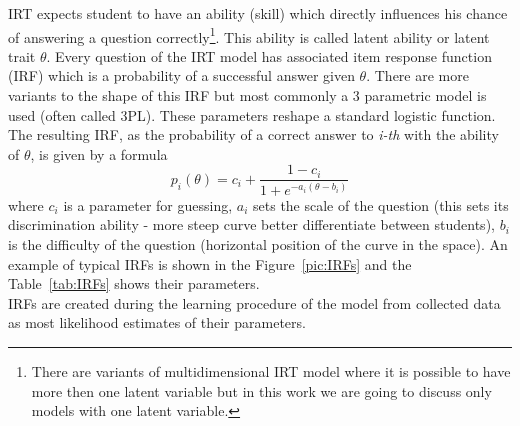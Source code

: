 IRT expects student to have an ability (skill) which directly influences his chance of answering a question correctly\footnote{There are variants of multidimensional IRT model where it is possible to have more then one latent variable but in this work we are going to discuss only models with one latent variable.}. This ability is called latent ability or latent trait $\theta$. Every question of the IRT model has associated item response function (IRF) which is a probability of a successful answer given $\theta$. There are more variants to the shape of this IRF but most commonly a 3 parametric model is used (often called 3PL). These parameters reshape a standard logistic function. The resulting IRF, as the probability of a correct answer to \textit{i-th} with the ability of $\theta$, is given by a formula
\begin{equation}
p_i(\theta) = c_i + \frac{1-c_i}{1+e^{-a_i(\theta-b_i)}}
\label{eq:IRF}
\end{equation}
where $c_i$ is a parameter for guessing, $a_i$ sets the scale of the question (this sets its discrimination ability - more steep curve better differentiate between students), $b_i$ is the difficulty of the question (horizontal position of the curve in the space). An example of typical IRFs is shown in the Figure~\ref{pic:IRFs} and the Table~\ref{tab:IRFs} shows their parameters.\\
IRFs are created during the learning procedure of the model from collected data as most likelihood estimates of their parameters.

\begin{figure}
\begin{floatrow}
\end{floatrow}
\end{figure}



